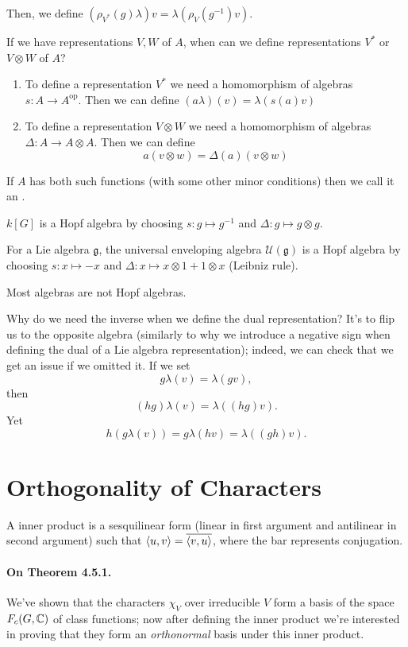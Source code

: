 \documentclass[oneside]{scrbook}
\begin{document}
Then, we define $(\rho_{V^*}(g)\lambda)v=\lambda(\rho_V(g^{-1})v)$.

\begin{remark}
If we have representations $V,W$ of $A$, when can we define representations $V^*$ or $V\otimes W$ of $A$?
\begin{enumerate}[(1)]
    \item To define a representation $V^*$ we need a homomorphism of algebras $s:A\to A^{\text{op}}$. Then we can define $(a\lambda)(v)=\lambda(s(a)v)$
    \item To define a representation $V\otimes W$ we need a homomorphism of algebras $\Delta:A\to A\otimes A$. Then we can define
    \[a(v\otimes w)=\Delta(a)(v\otimes w)\]
\end{enumerate}
If $A$ has both such functions (with some other minor conditions) then we call it an .

\begin{example}
$k[G]$ is a Hopf algebra by choosing $s:g\mapsto g^{-1}$ and $\Delta:g\mapsto g\otimes g$.
\end{example}

\begin{example}
For a Lie algebra $\mathfrak{g}$, the universal enveloping algebra $\mathcal{U}(\mathfrak{g})$ is a Hopf algebra by choosing $s:x\mapsto -x$ and $\Delta:x\mapsto x\otimes 1+1\otimes x$ (Leibniz rule).
\end{example}
Most algebras are not Hopf algebras.
\end{remark}

Why do we need the inverse when we define the dual representation? It's to flip us to the opposite algebra (similarly to why we introduce a negative sign when defining the dual of a Lie algebra representation); indeed, we can check that we get an issue if we omitted it. If we set
\[g\lambda(v)=\lambda(gv),\]
then
\[(hg)\lambda(v)=\lambda((hg)v).\]
Yet
\[h(g\lambda(v))=g\lambda(hv)=\lambda((gh)v).\]

\section{Orthogonality of Characters}

A  inner product is a sesquilinear form (linear in first argument and antilinear in second argument) such that $\langle u,v\rangle=\overline{\langle v,u\rangle}$, where the bar represents conjugation.

\paragraph{On Theorem 4.5.1.} We've shown that the characters $\chi_V$ over irreducible $V$ form a basis of the space $F_c(G,\mathbb C)$ of class functions; now after defining the inner product we're interested in proving that they form an \textit{orthonormal} basis under this inner product.
\end{document}
